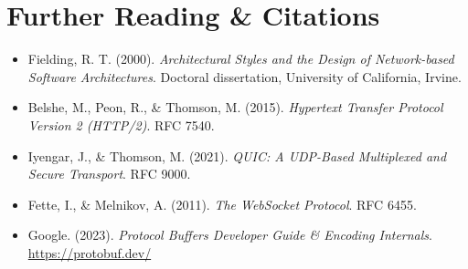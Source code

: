 \section{Further Reading \& Citations}

\begin{itemize}[leftmargin=15pt]
  \item Fielding, R. T. (2000). \textit{Architectural Styles and the Design of Network-based Software Architectures}. Doctoral dissertation, University of California, Irvine.
  \item Belshe, M., Peon, R., \& Thomson, M. (2015). \textit{Hypertext Transfer Protocol Version 2 (HTTP/2)}. RFC 7540.
  \item Iyengar, J., \& Thomson, M. (2021). \textit{QUIC: A UDP-Based Multiplexed and Secure Transport}. RFC 9000.
  \item Fette, I., \& Melnikov, A. (2011). \textit{The WebSocket Protocol}. RFC 6455.
  \item Google. (2023). \textit{Protocol Buffers Developer Guide \& Encoding Internals}. \url{https://protobuf.dev/}
\end{itemize}
